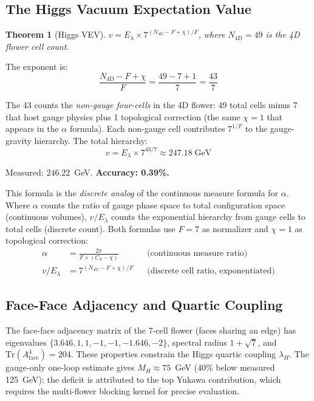 \documentclass[12pt,a4paper]{article}
\theoremstyle{plain}
\newtheorem{theorem}{Theorem}[section]
\theoremstyle{definition}
\begin{document}
\subsection{The Higgs Vacuum Expectation Value}

\begin{theorem}[Higgs VEV]\label{thm:vev}
$v = E_\lambda \times 7^{(N_{4\mathrm{D}} - F + \chi)/F}$, where $N_{4\mathrm{D}} = 49$ is the 4D flower cell count.
\end{theorem}

The exponent is:
\begin{equation}\label{eq:vev-exponent}
\frac{N_{4\mathrm{D}} - F + \chi}{F} = \frac{49 - 7 + 1}{7} = \frac{43}{7}
\end{equation}

The 43 counts the \emph{non-gauge four-cells} in the 4D flower: 49 total cells minus 7 that host gauge physics plus 1 topological correction (the same $\chi = 1$ that appears in the $\alpha$ formula). Each non-gauge cell contributes $7^{1/F}$ to the gauge-gravity hierarchy. The total hierarchy:
\begin{equation}\label{eq:vev}
\boxed{v = E_\lambda \times 7^{43/7} \approx 247.18 \;\mathrm{GeV}}
\end{equation}

Measured: $246.22$~GeV. \textbf{Accuracy: 0.39\%.}

This formula is the \emph{discrete analog} of the continuous measure formula for $\alpha$. Where $\alpha$ counts the ratio of gauge phase space to total configuration space (continuous volumes), $v/E_\lambda$ counts the exponential hierarchy from gauge cells to total cells (discrete count). Both formulas use $F = 7$ as normalizer and $\chi = 1$ as topological correction:
\begin{align}
\alpha &= \frac{2\pi}{F \times (C_d - \chi)} && \text{(continuous measure ratio)} \\
v/E_\lambda &= 7^{(N_{4\mathrm{D}} - F + \chi)/F} && \text{(discrete cell ratio, exponentiated)}
\end{align}

\subsection{Face-Face Adjacency and Quartic Coupling}

The face-face adjacency matrix of the 7-cell flower (faces sharing an edge) has eigenvalues $\{3.646, 1, 1, -1, -1, -1.646, -2\}$, spectral radius $1 + \sqrt{7}$, and $\mathrm{Tr}(A_{\mathrm{face}}^4) = 204$. These properties constrain the Higgs quartic coupling $\lambda_H$. The gauge-only one-loop estimate gives $M_H \approx 75$~GeV (40\% below measured 125~GeV); the deficit is attributed to the top Yukawa contribution, which requires the multi-flower blocking kernel for precise evaluation.
\end{document}
